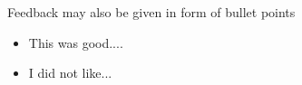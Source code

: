 \documentclass[a4paper, 9pt, twocolumn]{extarticle}
\begin{document}
Feedback may also be given in form of bullet points
\begin{itemize}
\item This was good....
\item I did not like...
\end{itemize}




\small

\end{document}
